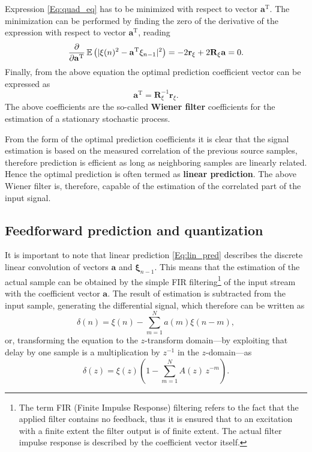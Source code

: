 Expression \ref{Eq:quad_eq} has to be minimized with respect to vector $\mathbf{a}^{\mathrm{T}}$.
The minimization can be performed by finding the zero of the derivative of the expression with respect to vector $\mathbf{a}^{\mathrm{T}}$, reading 
\begin{equation}
\frac{\partial}{\partial \mathbf{a}^{\mathrm{T}}}\operatorname{\mathbb{E}}\left( | \xi(n)^2 - \mathbf{a}^{\mathrm{T}} \mathbf{\xi}_{n-1} |^2 \right) =
- 2  \mathbf{r}_{\xi}  + 2\mathbf{R}_\xi \mathbf{a} = 0.
\end{equation}
Finally, from the above equation the optimal prediction coefficient vector can be expressed as
\begin{equation}
\mathbf{a}^{\mathrm{T}} =
\mathbf{R}_\xi^{-1} \mathbf{r}_{\xi}.
\end{equation}
The above coefficients are the so-called \textbf{Wiener filter} coefficients for the estimation of a stationary stochastic process.

From the form of the optimal prediction coefficients it is clear that the signal estimation is based on the measured correlation of the previous source samples, therefore prediction is efficient as long as neighboring samples are linearly related.
Hence the optimal prediction is often termed as \textbf{linear prediction}.
The above Wiener filter is, therefore, capable of the estimation of the correlated part of the input signal.

\subsection{Feedforward prediction and quantization}

It is important to note that linear prediction \eqref{Eq:lin_pred} describes the discrete linear convolution of vectors $\mathbf{a}$ and $\mathbf{\xi}_{n-1}$. 
This means that the estimation of the actual sample can be obtained by the simple FIR filtering\footnote{The term FIR (Finite Impulse Response) filtering refers to the fact that the applied filter contains no feedback, thus it is ensured that to an excitation with a finite extent the filter output is of finite extent.
The actual filter impulse response is described by the coefficient vector itself.} of the input stream with the coefficient vector $\mathbf{a}$.
The result of estimation is subtracted from the input sample, generating the differential signal, which therefore can be written as
\begin{equation}
\delta(n) = \xi(n) - \sum_{m=1}^{N} a(m) \xi(n-m),
\end{equation}
or, transforming the equation to the $z$-transform domain---by exploiting that delay by one sample is a multiplication by $z^{-1}$ in the $z$-domain---as
\begin{equation}
\delta(z) = \xi(z)\left( 1  - \sum_{m=1}^{N} A(z) \, z^{-m}\right).
\end{equation}

